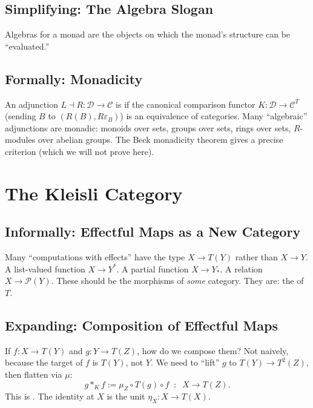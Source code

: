 \subsection{Simplifying: The Algebra Slogan}

Algebras for a monad are the objects on which the monad's structure can
be ``evaluated.''

\subsection{Formally: Monadicity}

An adjunction $L \dashv R : \mathcal{D} \to \mathcal{C}$ is 
if the canonical comparison functor $K : \mathcal{D} \to \mathcal{C}^T$
(sending $B$ to $(R(B), R \varepsilon_B)$) is an equivalence of
categories. Many ``algebraic'' adjunctions are monadic: monoids over
sets, groups over sets, rings over sets, $R$-modules over abelian groups.
The Beck monadicity theorem gives a precise criterion (which we will not
prove here).


\section{The Kleisli Category}
\label{sec:kleisli}

\subsection{Informally: Effectful Maps as a New Category}

Many ``computations with effects'' have the type $X \to T(Y)$ rather than
$X \to Y$. A list-valued function $X \to Y^*$. A partial function $X \to
Y_*$. A relation $X \to \mathcal{P}(Y)$. These should be the morphisms
of \emph{some} category. They are: the  of $T$.

\subsection{Expanding: Composition of Effectful Maps}

If $f : X \to T(Y)$ and $g : Y \to T(Z)$, how do we compose them? Not
naively, because the target of $f$ is $T(Y)$, not $Y$. We need to ``lift''
$g$ to $T(Y) \to T^2(Z)$, then flatten via $\mu$:
\begin{equation*}
  g *_K f := \mu_Z \circ T(g) \circ f \;\;:\;\; X \to T(Z).
\end{equation*}
This is . The identity at $X$ is the unit $\eta_X
: X \to T(X)$.

